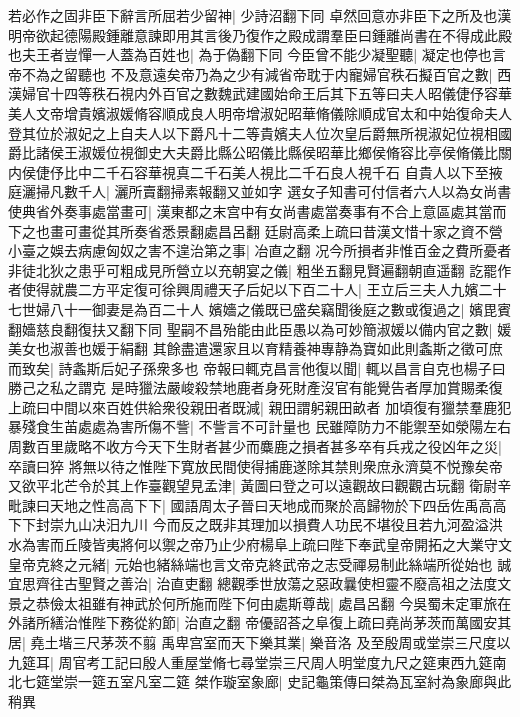 若必作之固非臣下辭言所屈若少留神|{
	少詩沼翻下同}
卓然回意亦非臣下之所及也漢明帝欲起德陽殿鍾離意諫即用其言後乃復作之殿成謂羣臣曰鍾離尚書在不得成此殿也夫王者豈憚一人蓋為百姓也|{
	為于偽翻下同}
今臣曾不能少凝聖聽|{
	凝定也停也言帝不為之留聽也}
不及意遠矣帝乃為之少有減省帝耽于内寵婦官秩石擬百官之數|{
	西漢婦官十四等秩石視内外百官之數魏武建國始命王后其下五等曰夫人昭儀倢伃容華美人文帝增貴嬪淑媛脩容順成良人明帝增淑妃昭華脩儀除順成官太和中始復命夫人登其位於淑妃之上自夫人以下爵凡十二等貴嬪夫人位次皇后爵無所視淑妃位視相國爵比諸侯王淑媛位視御史大夫爵比縣公昭儀比縣侯昭華比鄉侯脩容比亭侯脩儀比關内侯倢伃比中二千石容華視真二千石美人視比二千石良人視千石}
自貴人以下至掖庭灑掃凡數千人|{
	灑所賣翻掃素報翻又並如字}
選女子知書可付信者六人以為女尚書使典省外奏事處當畫可|{
	漢東都之末宫中有女尚書處當奏事有不合上意區處其當而下之也畫可畫從其所奏省悉景翻處昌呂翻}
廷尉高柔上疏曰昔漢文惜十家之資不營小臺之娛去病慮匈奴之害不遑治第之事|{
	冶直之翻}
况今所損者非惟百金之費所憂者非徒北狄之患乎可粗成見所營立以充朝宴之儀|{
	粗坐五翻見賢遍翻朝直遥翻}
訖罷作者使得就農二方平定復可徐興周禮天子后妃以下百二十人|{
	王立后三夫人九嬪二十七世婦八十一御妻是為百二十人}
嬪嬙之儀既已盛矣竊聞後庭之數或復過之|{
	嬪毘賓翻嬙慈良翻復扶又翻下同}
聖嗣不昌殆能由此臣愚以為可妙簡淑媛以備内官之數|{
	媛美女也淑善也媛于絹翻}
其餘盡遣還家且以育精養神專静為寶如此則螽斯之徵可庶而致矣|{
	詩螽斯后妃子孫衆多也}
帝報曰輒克昌言他復以聞|{
	輒以昌言自克也楊子曰勝己之私之謂克}
是時獵法嚴峻殺禁地鹿者身死財產沒官有能覺告者厚加賞賜柔復上疏曰中間以來百姓供給衆役親田者既減|{
	親田謂躬親田畝者}
加頃復有獵禁羣鹿犯暴殘食生苖處處為害所傷不訾|{
	不訾言不可計量也}
民雖障防力不能禦至如滎陽左右周數百里歲略不收方今天下生財者甚少而麋鹿之損者甚多卒有兵戎之役凶年之災|{
	卒讀曰猝}
將無以待之惟陛下寛放民間使得捕鹿遂除其禁則衆庶永濟莫不悦豫矣帝又欲平北芒令於其上作臺觀望見孟津|{
	黃圖曰登之可以遠觀故曰觀觀古玩翻}
衛尉辛毗諫曰天地之性高高下下|{
	國語周太子晉曰天地成而聚於高歸物於下四岳佐禹高高下下封崇九山决汨九川}
今而反之既非其理加以損費人功民不堪役且若九河盈溢洪水為害而丘陵皆夷將何以禦之帝乃止少府楊阜上疏曰陛下奉武皇帝開拓之大業守文皇帝克終之元緒|{
	元始也緒絲端也言文帝克終武帝之志受禪易制此絲端所從始也}
誠宜思齊往古聖賢之善治|{
	治直吏翻}
總觀季世放蕩之惡政曩使柦靈不廢高祖之法度文景之恭儉太祖雖有神武於何所施而陛下何由處斯尊哉|{
	處昌呂翻}
今吳蜀未定軍旅在外諸所繕治惟陛下務從約節|{
	治直之翻}
帝優詔荅之阜復上疏曰堯尚茅茨而萬國安其居|{
	堯土堦三尺茅茨不翦}
禹卑宫室而天下樂其業|{
	樂音洛}
及至殷周或堂崇三尺度以九筵耳|{
	周官考工記曰殷人重屋堂脩七尋堂崇三尺周人明堂度九尺之筵東西九筵南北七筵堂崇一筵五室凡室二筵}
桀作璇室象廊|{
	史記龜策傳曰桀為瓦室紂為象廊與此稍異}
